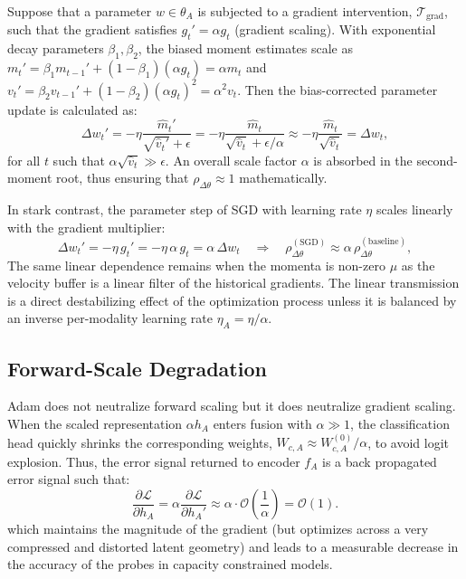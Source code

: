 \documentclass[conference]{IEEEtran}
\begin{document}
Suppose that a parameter $w \in \theta_A$ is subjected to a gradient intervention, $\mathcal{T}_{\text{grad}}$, such that the gradient satisfies $g_t' = \alpha g_t$ (gradient scaling). With exponential decay parameters $\beta_1, \beta_2$, the biased moment estimates scale as $m_t' = \beta_1 m_{t-1}' + (1 - \beta_1)(\alpha g_t) = \alpha m_t$ and $v_t' = \beta_2 v_{t-1}' + (1 - \beta_2)(\alpha g_t)^2 = \alpha^2 v_t$. Then the bias-corrected parameter update is calculated as:
\begin{equation}
    \Delta w_t' = -\eta \frac{\hat{m}_t'}{\sqrt{\hat{v}_t'} + \epsilon} = -\eta \frac{\hat{m}_t}{\sqrt{\hat{v}_t} + \epsilon/\alpha} \approx -\eta \frac{\hat{m}_t}{\sqrt{\hat{v}_t}} = \Delta w_t,
    \label{eq:adam_cancellation}
\end{equation}
for all $t$ such that $\alpha \sqrt{\hat{v}_t} \gg \epsilon$. An overall scale factor $\alpha$ is absorbed in the second-moment root, thus ensuring that $\rho_{\Delta\theta} \approx 1$ mathematically.

In stark contrast, the parameter step of SGD with learning rate $\eta$ scales linearly with the gradient multiplier:
\begin{equation}
    \Delta w_t' = -\eta\, g_t' = -\eta\,\alpha\, g_t = \alpha\,\Delta w_t
    \quad\Rightarrow\quad
    \rho_{\Delta\theta}^{(\text{SGD})} \approx \alpha\,\rho_{\Delta\theta}^{(\text{baseline})},
    \label{eq:sgd_drift}
\end{equation}
The same linear dependence remains when the momenta is non-zero $\mu$ as the velocity buffer is a linear filter of the historical gradients. The linear transmission is a direct destabilizing effect of the optimization process unless it is balanced by an inverse per-modality learning rate $\eta_A = \eta / \alpha$.

\subsection{Forward-Scale Degradation}
Adam does not neutralize forward scaling but it does neutralize gradient scaling. When the scaled representation $\alpha h_A$ enters fusion with $\alpha \gg 1$, the classification head quickly shrinks the corresponding weights, $W_{c,A} \approx W_{c,A}^{(0)}/\alpha$, to avoid logit explosion. Thus, the error signal returned to encoder $f_A$ is a back propagated error signal such that:
\begin{equation}
    \frac{\partial \mathcal{L}}{\partial h_A} = \alpha \frac{\partial \mathcal{L}}{\partial h_A'} \approx \alpha \cdot \mathcal{O}\!\left(\frac{1}{\alpha}\right) = \mathcal{O}(1).
    \label{eq:forward_gradient}
\end{equation}
which maintains the magnitude of the gradient (but optimizes across a very compressed and distorted latent geometry) and leads to a measurable decrease in the accuracy of the probes in capacity constrained models.
\end{document}

